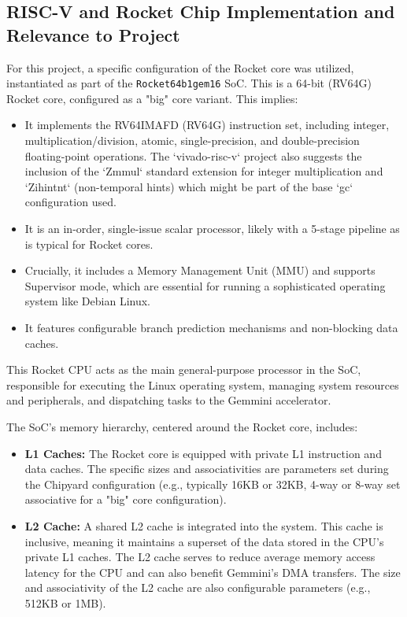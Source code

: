 \subsection{RISC-V and Rocket Chip Implementation and Relevance to Project}
\label{sec:riscv_rocket_implementation}
For this project, a specific configuration of the Rocket core was utilized, instantiated as part of the \texttt{Rocket64b1gem16} SoC. This is a 64-bit (RV64G) Rocket core, configured as a "big" core variant. This implies:
\begin{itemize}
    \item It implements the RV64IMAFD (RV64G) instruction set, including integer, multiplication/division, atomic, single-precision, and double-precision floating-point operations. The `vivado-risc-v` project also suggests the inclusion of the `Zmmul` standard extension for integer multiplication and `Zihintnt` (non-temporal hints) which might be part of the base `gc` configuration used.
    \item It is an in-order, single-issue scalar processor, likely with a 5-stage pipeline as is typical for Rocket cores.
    \item Crucially, it includes a Memory Management Unit (MMU) and supports Supervisor mode, which are essential for running a sophisticated operating system like Debian Linux.
    \item It features configurable branch prediction mechanisms and non-blocking data caches.
\end{itemize}
This Rocket CPU acts as the main general-purpose processor in the SoC, responsible for executing the Linux operating system, managing system resources and peripherals, and dispatching tasks to the Gemmini accelerator.

The SoC's memory hierarchy, centered around the Rocket core, includes:
\begin{itemize}
    \item \textbf{L1 Caches:} The Rocket core is equipped with private L1 instruction and data caches. The specific sizes and associativities are parameters set during the Chipyard configuration (e.g., typically 16KB or 32KB, 4-way or 8-way set associative for a "big" core configuration).
    \item \textbf{L2 Cache:} A shared L2 cache is integrated into the system. This cache is inclusive, meaning it maintains a superset of the data stored in the CPU's private L1 caches. The L2 cache serves to reduce average memory access latency for the CPU and can also benefit Gemmini's DMA transfers. The size and associativity of the L2 cache are also configurable parameters (e.g., 512KB or 1MB).
\end{itemize}

